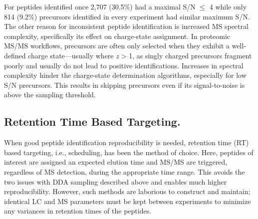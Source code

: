 For peptides identified once 2,707 (30.5\%) had a maximal S/N $\leq$ 4 while only 814 (9.2\%) precursors identified in every experiment had similar maximum S/N. The other reason for inconsistent peptide identification is increased MS spectral complexity, specifically its effect on charge-state assignment. In proteomic MS/MS workflows, precursors are often only selected when they exhibit a well-defined charge state---usually where \textit{z} > 1, as singly charged precursors fragment poorly and usually do not lead to positive identifications. Increases in spectral complexity hinder the charge-state determination algorithms, especially for low S/N precursors. This results in skipping precursors even if its signal-to-noise is above the sampling threshold.

\subsection{Retention Time Based Targeting.}

When good peptide identification reproducibility is needed, retention time (RT) based targeting, i.e., scheduling, has been the method of choice. Here, peptides of interest are assigned an expected elution time and MS/MS are triggered, regardless of MS detection, during the appropriate time range. This avoids the two issues with DDA sampling described above and enables much higher reproducibility. However, such methods are laborious to construct and maintain; identical LC and MS parameters must be kept between experiments to minimize any variances in retention times of the peptides.

